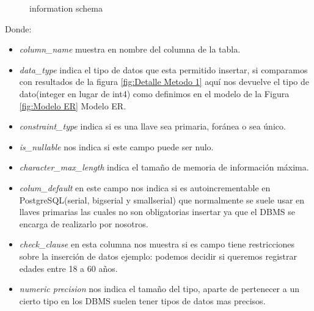 \begin{figure}[H]
\centering
{}
\caption{information schema} \label{fig:Detalle Metodo 2}
\end{figure}
Donde:
\begin{itemize}
\item \emph{column\_name} muestra en nombre del columna de la tabla.
\item \emph{data\_type} indica el tipo de datos que esta permitido insertar, si comparamos con resultados de la figura \ref{fig:Detalle Metodo 1} aqu\'i nos devuelve el tipo de dato(integer en lugar de int4) como definimos en el modelo de la Figura \ref{fig:Modelo ER} Modelo ER.
\item \emph{constraint\_type} indica si es una llave sea primaria, for\'anea o sea \'unico.
\item \emph{is\_nullable} nos indica si este campo puede ser nulo.
\item \emph{character\_max\_length} indica el tama\~no de memoria de informaci\'on m\'axima.
\item \emph{colum\_default} en este campo nos indica si es autoincrementable en PostgreSQL(serial, bigserial y smallserial) que normalmente se suele usar en llaves primarias las cuales no son obligatorias insertar ya que el DBMS se encarga de realizarlo por nosotros.
\item \emph{check\_clause} en esta columna nos muestra si es campo tiene restricciones sobre la inserci\'on de datos ejemplo: podemos decidir si queremos registrar edades entre 18 a 60 a\~nos. 
\item \emph{numeric precision} nos indica el tama\~no del tipo, aparte de pertenecer a un cierto tipo en los DBMS suelen tener tipos de datos mas precisos.  
\end{itemize}
